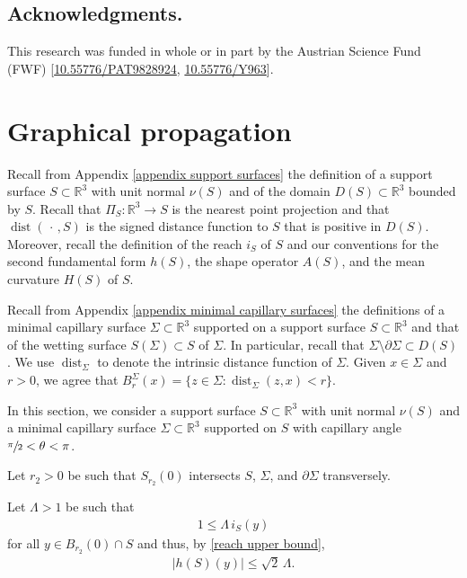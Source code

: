 \documentclass[11pt]{amsart}
\begin{document}
\subsection*{Acknowledgments.}  This research was  funded in whole or in part by the
Austrian Science Fund (FWF) [\href{https://www.fwf.ac.at/en/research-radar/10.55776/PAT9828924}{10.55776/PAT9828924}, \href{https://www.fwf.ac.at/en/research-radar/10.55776/Y963}{10.55776/Y963}].
	\section{Graphical propagation}
	Recall from Appendix \ref{appendix support surfaces} the definition of a support surface $S\subset \mathbb{R}^3$ with unit normal $\nu(S)$ and of the domain $D(S)\subset \mathbb{R}^3$ bounded by $S$.  Recall that $\Pi_S:\mathbb{R}^3\to S$ is the nearest point projection and that $\operatorname{dist}(\,\cdot\,,S)$ is the signed distance function to $S$ that is positive in $D(S)$. Moreover, recall the definition of the reach $i_S$ of $S$ and our conventions for the second fundamental form $h(S)$, the shape operator $A(S)$, and the mean curvature $H(S)$ of $S$.
	
	
	Recall from Appendix \ref{appendix minimal capillary surfaces}  the  definitions of a minimal capillary surface $\Sigma \subset \mathbb{R}^3$ supported on a support surface $S\subset \mathbb{R}^3$  and that of the wetting surface $S(\Sigma)\subset S$ of $\Sigma$. In particular, recall that  $\Sigma\setminus \partial \Sigma \subset D(S)$. We use $\operatorname{dist}_\Sigma$ to denote the intrinsic distance function of $\Sigma$. Given $x\in \Sigma$ and $r>0$, we agree that $B_r^\Sigma(x)=\{z\in \Sigma:\operatorname{dist}_\Sigma(z,x)<r\}$. 
	
	In this section, we consider a support surface $S\subset \mathbb{R}^3$  with unit normal $\nu(S)$
	 and a minimal capillary surface $\Sigma\subset \mathbb{R}^3$ supported on $S$ with capillary angle $\sfrac{\pi}{2}<\theta<\pi$.
	 
	
	
Let $r_2>0$ be such that $S_{r_2}(0)$ intersects $S$, $\Sigma$, and $\partial \Sigma$ transversely. 

Let  $\Lambda>1$ be such that 
	\begin{align} \label{geometry bound} 
	1\leq \Lambda\,i_S(y)
	\end{align} 
for all $y\in B_{r_2}(0)\cap S$ and thus, by  \eqref{reach upper bound},  
	\begin{align*}
|h(S)(y)|\leq \sqrt{2}\,\Lambda.
	\end{align*}
	
\end{document}
